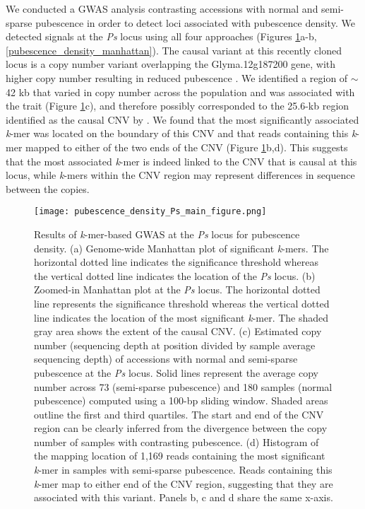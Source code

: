 We conducted a GWAS analysis contrasting accessions with normal and semi-sparse
pubes\-cence in order to detect loci associated with pubescence density. We
detected signals at the \textit{Ps} locus using all four approaches (Figures
\ref{pubescence-density-main-figure}a-b, \ref{pubescence_density_manhattan}). The causal
variant at this recently cloned locus is a copy number variant overlapping the
Glyma.12g187200 gene, with higher copy number resulting in reduced pubescence \citep{liu2020ps}.
We identified a region of $\sim$42 kb that varied in copy number across
the population and was associated with the trait (Figure
\ref{pubescence-density-main-figure}c), and therefore possibly corresponded to the
25.6-kb region identified as the causal CNV by \cite{liu2020ps}. We found that
the most significantly associated \textit{k}-mer was located on the boundary of this CNV
and that reads containing this \textit{k}-mer mapped to either of the two ends
of the CNV (Figure \ref{pubescence-density-main-figure}b,d). This suggests that
the most associated \textit{k}-mer is indeed linked to the CNV
that is causal at this locus, while \textit{k}-mers within the
CNV region may represent differences in sequence between the copies.

\begin{figure}
	\centering
	\texttt{[image: pubescence\_density\_Ps\_main\_figure.png]}
	\caption[Results of \textit{k}-mer-based GWAS at the
	\textit{Ps} locus for pubescence density.]{Results of \textit{k}-mer-based GWAS at the
	\textit{Ps} locus for pubescence density.
	(a) Genome-wide Manhattan plot of significant \textit{k}-mers. The
	horizontal dotted line indicates the significance threshold whereas the
	vertical dotted line indicates the location of the \textit{Ps} locus.
	(b) Zoomed-in Manhattan plot at the \textit{Ps} locus.  The horizontal
	dotted line represents the significance threshold whereas the
	vertical dotted line indicates the location of the most significant
	\textit{k}-mer. The shaded gray area shows the extent of the causal CNV.
	(c) Estimated copy number (sequencing depth at position divided by
	sample average sequencing depth) of accessions with normal and
	semi-sparse pubescence at the \textit{Ps} locus. Solid lines represent
	the average copy number across 73 (semi-sparse pubescence) and 180
	samples (normal pubescence) computed using a 100-bp sliding window.
	Shaded areas outline the first and third quartiles. The start and end
	of the CNV region can be clearly inferred from the divergence between
	the copy number of samples with contrasting pubescence.
	(d) Histogram of the mapping location of 1,169 reads containing the
	most significant \textit{k}-mer in samples with semi-sparse pubescence.
	Reads containing this \textit{k}-mer map to either end of the CNV
	region, suggesting that they are associated with this variant. Panels
	b, c and d share the same x-axis.}
	\label{pubescence-density-main-figure}
\end{figure}

